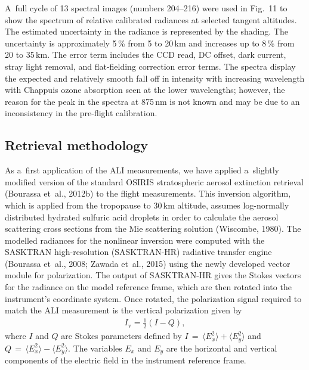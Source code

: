 \documentclass[amt]{copernicus}
\begin{document}
A~full cycle of 13 spectral images (numbers 204--216) were used in Fig.~11 to
show the spectrum of relative calibrated radiances at selected tangent
altitudes. The estimated uncertainty in the radiance is represented by the
shading. The uncertainty is approximately 5\,{\%} from 5 to
20\,\unit{km} and increases up to 8\,{\%} from 20 to 35\,\unit{km}. The
error term includes the CCD read, DC offset, dark current, stray light
removal, and flat-fielding correction error terms. The spectra display the
expected and relatively smooth fall off in intensity with increasing
wavelength with Chappuis ozone absorption seen at the lower wavelengths;
however, the reason for the peak in the spectra at 875\,\unit{nm} is not
known and may be due to an inconsistency in the pre-flight calibration.



\subsection{Retrieval methodology}

As a~first application of the ALI measurements, we have applied
a~slightly modified version of the standard OSIRIS stratospheric
aerosol extinction retrieval (Bourassa et~al., 2012b) to the flight
measurements. This inversion algorithm, which is applied from the
tropopause to 30\,\unit{km} altitude, assumes log-normally distributed
hydrated sulfuric acid droplets in order to calculate the aerosol
scattering cross sections from the Mie scattering solution (Wiscombe,
1980). The modelled radiances for the nonlinear inversion were computed
with the SASKTRAN high-resolution
(SASKTRAN-HR) radiative transfer engine (Bourassa et~al., 2008; Zawada et~al., 2015) using the
newly developed vector module for polarization. The output of SASKTRAN-HR gives the Stokes vectors for the
radiance on the model reference frame, which are then rotated into the
instrument's coordinate system. Once rotated, the polarization signal
required to match the ALI measurement is the vertical polarization
given by
\begin{align}
I_{\mathrm{v}}=\frac{1}{2}\left(I-Q \right),
\end{align}
where $I$ and $Q$ are Stokes parameters defined by $I\,=\,\langle
E_x^2\rangle + \langle E_y^2\rangle$ and $Q\,=\,\langle E_x^2\rangle -
\langle E_y^2\rangle$. The variables $E_{x}$ and $E_{y}$ are the
horizontal and vertical components of the electric field in the
instrument reference frame.
\end{document}
